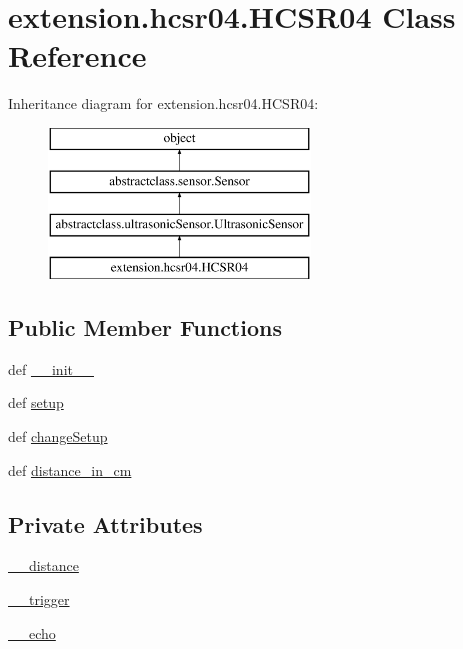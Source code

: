 \hypertarget{classextension_1_1hcsr04_1_1HCSR04}{}\section{extension.\+hcsr04.\+H\+C\+S\+R04 Class Reference}
\label{classextension_1_1hcsr04_1_1HCSR04}
Inheritance diagram for extension.\+hcsr04.\+H\+C\+S\+R04\+:\begin{figure}[H]
\begin{center}
\leavevmode
\includegraphics[height=4.000000cm]{classextension_1_1hcsr04_1_1HCSR04}
\end{center}
\end{figure}
\subsection*{Public Member Functions}
\begin{DoxyCompactItemize}
\item 
def \hyperlink{classextension_1_1hcsr04_1_1HCSR04_a2d77af1c48def63a8a79b56469ef8e5c}{\+\_\+\+\_\+init\+\_\+\+\_\+}
\item 
def \hyperlink{classextension_1_1hcsr04_1_1HCSR04_acea94777e3937ae036544c3293fd36f6}{setup}
\item 
def \hyperlink{classextension_1_1hcsr04_1_1HCSR04_a8773c46e4517545691e79554fa55fcf2}{change\+Setup}
\item 
def \hyperlink{classextension_1_1hcsr04_1_1HCSR04_a72de5a5c8e17e9f6b528570841e557e2}{distance\+\_\+in\+\_\+cm}
\end{DoxyCompactItemize}
\subsection*{Private Attributes}
\begin{DoxyCompactItemize}
\item 
\hyperlink{classextension_1_1hcsr04_1_1HCSR04_af3d02ed9cc4aa42dbc6d3ae2108435ab}{\+\_\+\+\_\+distance}
\item 
\hyperlink{classextension_1_1hcsr04_1_1HCSR04_a6bbac2dbe57cd5c8d684bb4660a30326}{\+\_\+\+\_\+trigger}
\item 
\hyperlink{classextension_1_1hcsr04_1_1HCSR04_a3f98f7d8fbe4b6ded144157805d9f4c0}{\+\_\+\+\_\+echo}
\end{DoxyCompactItemize}


